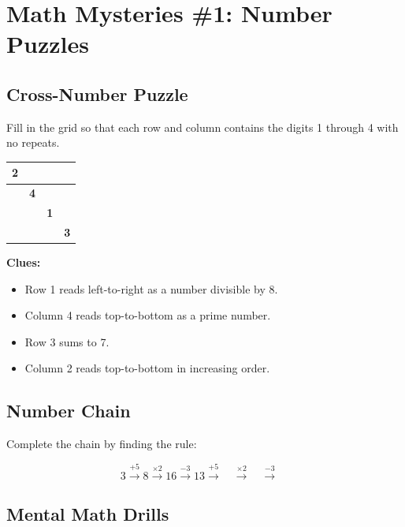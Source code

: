 \documentclass[
    language=english,
    doctype=activity-book,
    institution=none,
]{../../omnilatex}
\begin{document}
\maketitle

\section{Math Mysteries \#1: Number Puzzles}

\subsection{Cross-Number Puzzle}

Fill in the grid so that each row and column contains the digits 1 through 4 with no repeats.

\begin{center}
\begin{tabular}{|c|c|c|c|}
\hline
\textbf{2} & & & \\
\hline
& \textbf{4} & & \\
\hline
& & \textbf{1} & \\
\hline
& & & \textbf{3} \\
\hline
\end{tabular}
\end{center}

\noindent\textbf{Clues:}
\begin{itemize}
    \item Row 1 reads left-to-right as a number divisible by 8.
    \item Column 4 reads top-to-bottom as a prime number.
    \item Row 3 sums to 7.
    \item Column 2 reads top-to-bottom in increasing order.
\end{itemize}

\subsection{Number Chain}

Complete the chain by finding the rule:

\[
3 \xrightarrow{+5} 8 \xrightarrow{\times 2} 16 \xrightarrow{-3} 13 \xrightarrow{+5} \boxed{\phantom{00}} \xrightarrow{\times 2} \boxed{\phantom{00}} \xrightarrow{-3} \boxed{\phantom{00}}
\]

\subsection{Mental Math Drills}
\end{document}
